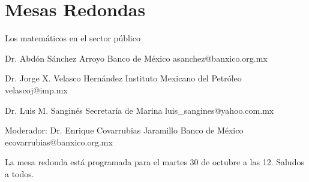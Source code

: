 \section{Mesas Redondas}

Los matemáticos en el sector público

Dr. Abdón Sánchez Arroyo
Banco de México
asanchez@banxico.org.mx

Dr. Jorge X. Velasco Hernández
Instituto Mexicano del Petróleo
velascoj@imp.mx

Dr. Luis M. Sanginés
Secretaría de Marina
luis_sangines@yahoo.com.mx

Moderador:
Dr. Enrique Covarrubias Jaramillo
Banco de México
ecovarrubias@banxico.org.mx

La mesa redonda está programada para el martes 30 de octubre a las 12.  Saludos a todos.


